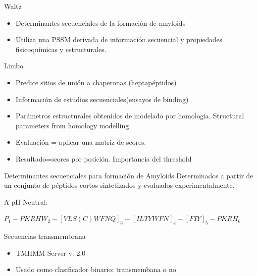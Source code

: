 \documentclass{beamer}
\begin{document}
\begin{frame}{Waltz}  
  \begin{itemize}
   \item Determinantes secuenciales de la formación de amyloids
   \item Utiliza una PSSM derivada de información secuencial y propiedades fisicoquímicas y estructurales. 
  \end{itemize}

\end{frame}

\begin{frame}{Limbo}  
  \begin{itemize}
   \item Predice sitios de unión a chaperonas (heptapéptidos) 
   \item Información de estudios secuenciales(ensayos de binding)
   \item Parámetros estructurales obtenidos de modelado por homología. Structural parameters from homology modelling
   \item Evaluación = aplicar una matriz de scores. 
   \item Resultado=scores por posición. Importancia del threshold
  \end{itemize}

\end{frame}

\begin{frame}{Determinantes secuenciales para formación de Amyloids}  
 Determinados a partir de un conjunto de péptidos cortos sintetizados y evaluados experimentalmente.
 
 A pH Neutral:
 
 ${P}_1 - {PKRHW}_2 -[VLS(C)WFNQ]_3 -[ILTYWFN]_4 - [FIY]_5- {PKRH}_6$
\end{frame}

\begin{frame}{Secuencias transmembrana}
 \begin{itemize}
  \item TMHMM Server v. 2.0
  \item Usado como clasificador binario: transmembana o no
 \end{itemize}

\end{frame}
\end{document}
